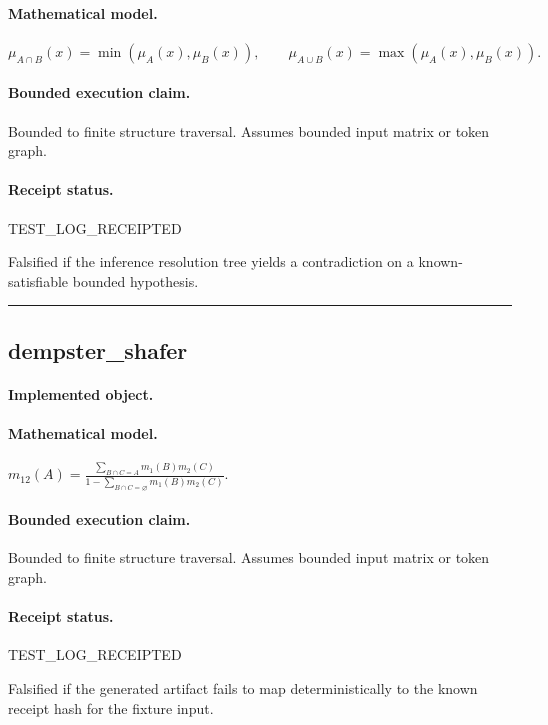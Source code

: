\paragraph{Mathematical model.} $\mu_{A\cap B}(x)=\min(\mu_A(x),\mu_B(x)), \qquad \mu_{A\cup B}(x)=\max(\mu_A(x),\mu_B(x)).$
\paragraph{Bounded execution claim.} Bounded to finite structure traversal. Assumes bounded input matrix or token graph.
\paragraph{Receipt status.} TEST\_LOG\_RECEIPTED
\begin{falsifier}
Falsified if the inference resolution tree yields a contradiction on a known-satisfiable bounded hypothesis.
\end{falsifier}

\vspace{1em}\hrule\vspace{1em}
\subsection{dempster\_shafer}
\paragraph{Implemented object.} 
\paragraph{Mathematical model.} $m_{12}(A) = \frac{\sum_{B\cap C=A}m_1(B)m_2(C)}{1-\sum_{B\cap C=\varnothing}m_1(B)m_2(C)}.$
\paragraph{Bounded execution claim.} Bounded to finite structure traversal. Assumes bounded input matrix or token graph.
\paragraph{Receipt status.} TEST\_LOG\_RECEIPTED
\begin{falsifier}
Falsified if the generated artifact fails to map deterministically to the known receipt hash for the fixture input.
\end{falsifier}

